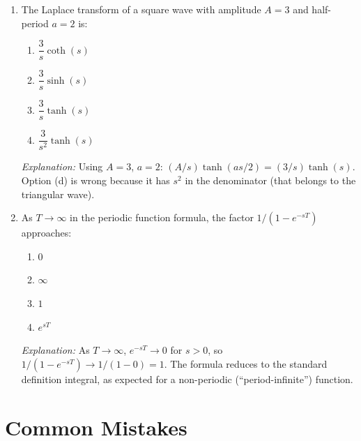 \documentclass[12pt,a4paper]{article}
\begin{document}
\begin{enumerate}[label=\textbf{MCQ \arabic*.}, leftmargin=*, itemsep=12pt]
\item The Laplace transform of a square wave with amplitude $A = 3$ and
half-period $a = 2$ is:
\begin{enumerate}[label=(\alph*)]
  \item $\dfrac{3}{s}\coth(s)$
  \item $\dfrac{3}{s}\sinh(s)$
  \item \textbf{$\dfrac{3}{s}\tanh(s)$}
  \item $\dfrac{3}{s^2}\tanh(s)$
\end{enumerate}
\textit{Explanation:} Using $A=3$, $a=2$: $(A/s)\tanh(as/2)=(3/s)\tanh(s)$.  Option (d) is wrong because it has $s^2$ in the denominator (that belongs to the triangular wave).

\item As $T \to \infty$ in the periodic function formula, the factor
$1/(1-e^{-sT})$ approaches:
\begin{enumerate}[label=(\alph*)]
  \item $0$
  \item $\infty$
  \item \textbf{$1$}
  \item $e^{sT}$
\end{enumerate}
\textit{Explanation:} As $T \to \infty$, $e^{-sT} \to 0$ for $s>0$, so $1/(1-e^{-sT}) \to 1/(1-0) = 1$.  The formula reduces to the standard definition integral, as expected for a non-periodic (``period-infinite'') function.

\end{enumerate}

\section{Common Mistakes}
\end{document}
